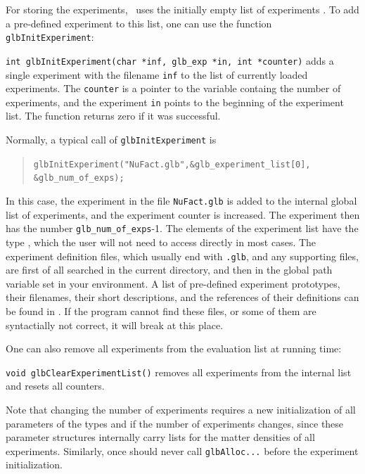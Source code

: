 For storing the experiments, \GLOBES\ uses the initially empty list of experiments . To add a pre-defined experiment to this list, one can use the function {\tt glbInitExperiment}:
\begin{function}
{\tt int glbInitExperiment(char *inf, glb\_exp *in, int *counter)}
 adds a single experiment with the filename {\tt inf} to the list of currently loaded experiments. The {\tt counter} is a pointer to the 
 variable containg the number of experiments, and the experiment {\tt in}
 points to the beginning of the experiment list. The function returns
 zero if it was successful. 
\end{function}
Normally, a typical  call of {\tt glbInitExperiment} is 
\begin{quote}
{\tt glbInitExperiment("NuFact.glb",\&glb\_experiment\_list[0],\\  \hspace*{8cm} \&glb\_num\_of\_exps); }
\end{quote}
In this case, the experiment in the file {\tt NuFact.glb} is added to the internal global list of experiments, and the experiment counter is increased. The
experiment then has the number {\tt glb\_num\_of\_exps}-1. The elements
of the experiment list have the type , which the
user will not need to access directly in most cases. The experiment definition files, which usually end with {\tt .glb}, and any
supporting files, are first of all searched in the current directory, and then in the global path variable  set in your environment.
A list of pre-defined experiment prototypes, their filenames, their short descriptions, and the references of their definitions can be found in . If the program cannot find these files, or some of them are syntactially not correct, it will break at this place. 

One can also remove all experiments from the evaluation list at running
 time:
\begin{function}
{\tt void glbClearExperimentList()} removes all experiments from the internal list and resets all counters.   
\end{function}
Note that changing the number of experiments requires a new initialization
of all parameters of the types  and 
if the number of experiments changes, since these parameter structures internally carry lists for the matter densities of all experiments. Similarly, once should never call {\tt glbAlloc...} before the
experiment initialization.

